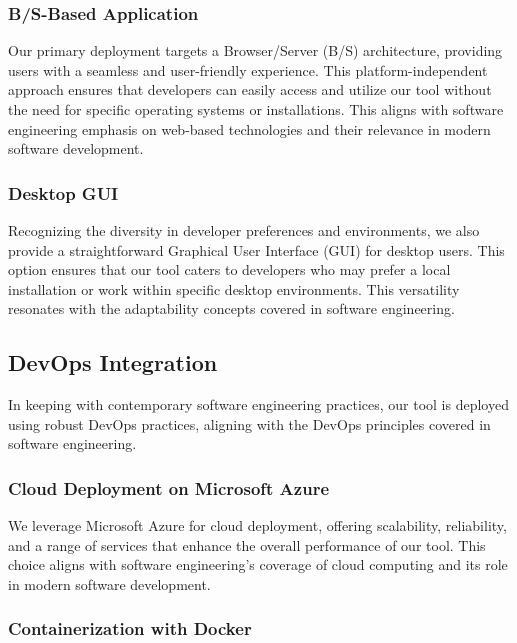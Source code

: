 \documentclass[journal]{IEEEtran}
\begin{document}
\subsubsection{B/S-Based Application}

Our primary deployment targets a Browser/Server (B/S) architecture, providing users with a seamless and user-friendly experience. This platform-independent approach ensures that developers can easily access and utilize our tool without the need for specific operating systems or installations. This aligns with software engineering emphasis on web-based technologies and their relevance in modern software development.

\subsubsection{Desktop GUI}

Recognizing the diversity in developer preferences and environments, we also provide a straightforward Graphical User Interface (GUI) for desktop users. This option ensures that our tool caters to developers who may prefer a local installation or work within specific desktop environments. This versatility resonates with the adaptability concepts covered in software engineering.

\subsection{DevOps Integration}

In keeping with contemporary software engineering practices, our tool is deployed using robust DevOps practices, aligning with the DevOps principles covered in software engineering.

\subsubsection{Cloud Deployment on Microsoft Azure}

We leverage Microsoft Azure for cloud deployment, offering scalability, reliability, and a range of services that enhance the overall performance of our tool. This choice aligns with software engineering's coverage of cloud computing and its role in modern software development.

\subsubsection{Containerization with Docker}
\end{document}
